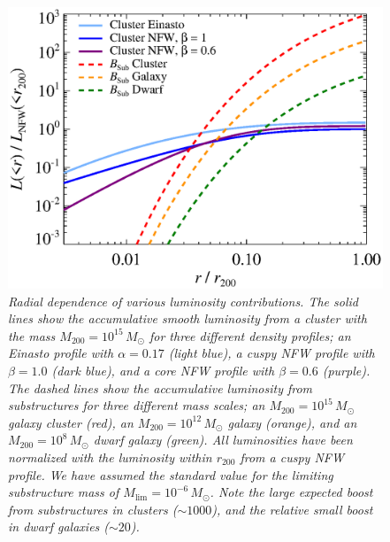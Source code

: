 \documentclass[10pt,aps,pra,reprint,amsmath,amsfonts,amssymb,showpacs]{revtex4-1}
\newcommand{\rmn}{\mathrm}
\newcommand{\msun}{M_\odot}
\newcommand{\rvir}{r_{200}}
\newcommand{\mvir}{M_{200}}
\begin{document}
\begin{figure}%
 \includegraphics[width=0.99\columnwidth]{figures/dens.prof.eps}
\caption{\it Radial dependence of various luminosity
  contributions. The solid lines show the accumulative smooth
  luminosity from a cluster with the mass $\mvir=10^{15}\,\msun$ for
  three different density profiles; an Einasto profile with
  $\alpha=0.17$ (light blue), a cuspy NFW profile with $\beta=1.0$
  (dark blue), and a core NFW profile with $\beta=0.6$ (purple). The
  dashed lines show the accumulative luminosity from substructures for
  three different mass scales; an $\mvir=10^{15}\,\msun$ galaxy
  cluster (red), an $\mvir=10^{12}\,\msun$ galaxy (orange), and an
  $\mvir=10^{8}\,\msun$ dwarf galaxy (green). All luminosities have
  been normalized with the luminosity within $\rvir$ from a cuspy NFW
  profile. We have assumed the standard value for the limiting
  substructure mass of $M_\rmn{lim}=10^{-6}\,\msun$. Note the large
  expected boost from substructures in clusters ($\sim1000$), and the
  relative small boost in dwarf galaxies ($\sim20$).}
 \label{fig:radial_lum}
\end{figure}
\end{document}
